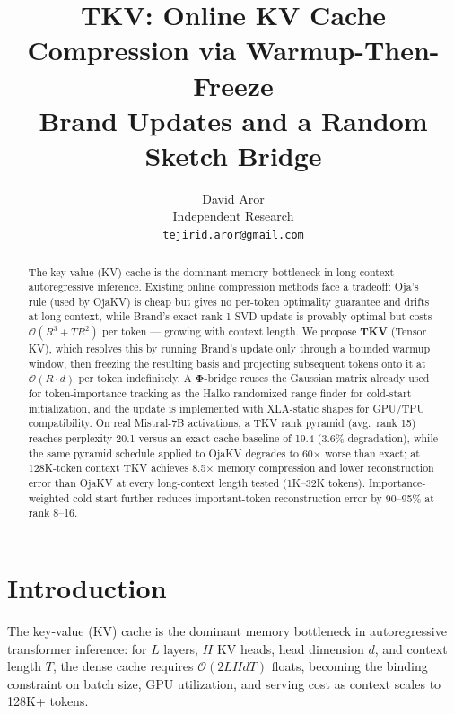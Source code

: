 \documentclass{article}
\title{\textbf{TKV: Online KV Cache Compression via Warmup-Then-Freeze\\
Brand Updates and a Random Sketch Bridge}}
\author{
  David Aror \\
  Independent Research \\
  \texttt{tejirid.aror@gmail.com}
}
\date{}
\let\PhiSymbol\Phi
\renewcommand{\Phi}{\boldsymbol{\PhiSymbol}}
\begin{document}
\ifcolmsubmission
\linenumbers
\fi

\maketitle

\begin{abstract}
The key-value (KV) cache is the dominant memory bottleneck in long-context
autoregressive inference. Existing online compression methods face a
tradeoff: Oja's rule (used by OjaKV) is cheap but gives no per-token
optimality guarantee and drifts at long context, while Brand's exact
rank-1 SVD update is provably optimal but costs $\mathcal{O}(R^3 + TR^2)$
per token --- growing with context length. We propose \textbf{TKV} (Tensor
KV), which resolves this by running Brand's update only through a bounded
warmup window, then freezing the resulting basis and projecting subsequent
tokens onto it at $\mathcal{O}(R{\cdot}d)$ per token indefinitely. A
$\Phi$-bridge reuses the Gaussian matrix already used for token-importance
tracking as the Halko randomized range finder for cold-start
initialization, and the update is implemented with XLA-static shapes for
GPU/TPU compatibility. On real Mistral-7B activations, a TKV rank pyramid
(avg.\ rank 15) reaches perplexity 20.1 versus an exact-cache baseline of
19.4 (3.6\% degradation), while the same pyramid schedule applied to
OjaKV degrades to 60$\times$ worse than exact; at 128K-token context TKV
achieves 8.5$\times$ memory compression and lower reconstruction error
than OjaKV at every long-context length tested (1K--32K tokens).
Importance-weighted cold start further reduces important-token
reconstruction error by 90--95\% at rank 8--16.
\end{abstract}

\section{Introduction}
\label{sec:intro}

The key-value (KV) cache is the dominant memory bottleneck in autoregressive
transformer inference: for $L$ layers, $H$ KV heads, head dimension $d$,
and context length $T$, the dense cache requires $\mathcal{O}(2LHdT)$
floats, becoming the binding constraint on batch size, GPU utilization,
and serving cost as context scales to 128K+ tokens.
\end{document}
